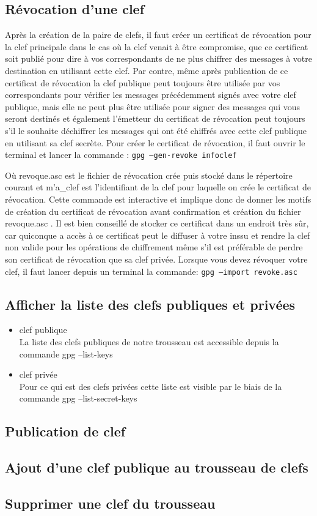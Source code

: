 \subsection {Révocation d'une clef}
 Après la création de la paire de clefs, il faut créer un certificat de révocation pour la clef principale dans le cas où la clef
venait à être compromise, que ce certificat soit publié pour dire à vos correspondants de ne plus chiffrer des messages à votre
destination en utilisant cette  clef. Par contre, même après publication de ce certificat de révocation la clef publique peut toujours 
être utilisée par vos correspondants pour vérifier les messages précédemment signés avec votre clef publique, mais elle ne peut plus 
être utilisée pour signer des messages qui vous seront destinés et également l'émetteur du certificat de révocation peut toujours 
s'il  le souhaite déchiffrer les messages qui ont été chiffrés avec cette clef publique en utilisant sa clef secrète.
Pour créer le certificat de révocation, il faut ouvrir le terminal et lancer la commande : \texttt{gpg --gen-revoke infoclef}

Où revoque.asc est le fichier de révocation crée puis stocké dans le répertoire courant et m’a\_clef est l'identifiant de la clef pour
laquelle on crée le certificat de révocation.
Cette commande est interactive et implique donc de donner les motifs de création du certificat de révocation avant confirmation et 
création du fichier revoque.asc .
Il est bien conseillé de stocker ce certificat dans un endroit très sûr, car quiconque a accès à ce certificat peut le diffuser à votre inssu
et rendre la clef non valide pour les opérations de chiffrement même s'il est préférable de perdre son certificat de révocation que sa clef privée.
Lorsque vous devez révoquer votre clef, il faut lancer depuis un terminal la commande:
\texttt{gpg --import revoke.asc } \\


\subsection {Afficher la liste des clefs publiques et privées}
\begin{itemize}
\item clef publique\\
La liste des clefs publiques de notre trousseau est accessible depuis la commande gpg --list-keys

\item clef privée\\
Pour ce qui est des clefs privées cette liste est visible par le biais de la commande gpg --list-secret-keys
\end{itemize}

\subsection{Publication de clef}

\subsection{Ajout d'une clef publique au trousseau de clefs}

\subsection{Supprimer une clef du trousseau}



